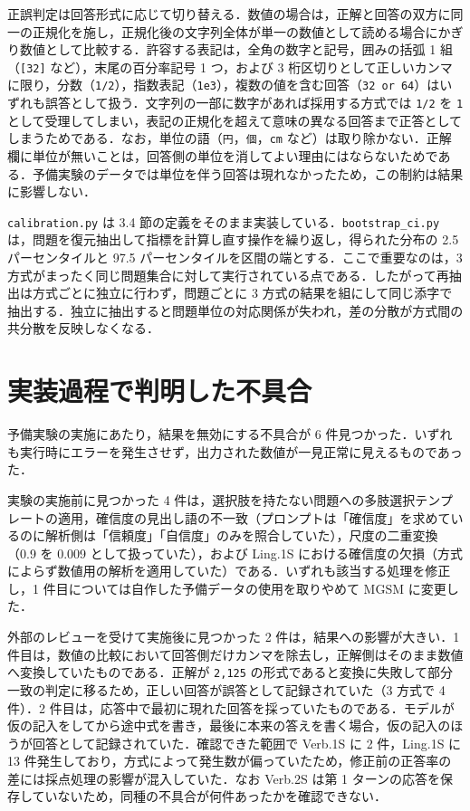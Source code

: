 正誤判定は回答形式に応じて切り替える．数値の場合は，正解と回答の双方に同一の正規化を施し，正規化後の文字列全体が単一の数値として読める場合にかぎり数値として比較する．許容する表記は，全角の数字と記号，囲みの括弧 1 組（\texttt{[32]} など），末尾の百分率記号 1 つ，および 3 桁区切りとして正しいカンマに限り，分数（\texttt{1/\allowbreak{}2}），指数表記（\texttt{1e3}），複数の値を含む回答（\texttt{32 or 64}）はいずれも誤答として扱う．文字列の一部に数字があれば採用する方式では \texttt{1/\allowbreak{}2} を \texttt{1} として受理してしまい，表記の正規化を超えて意味の異なる回答まで正答としてしまうためである．なお，単位の語（\texttt{円}，\texttt{個}，\texttt{cm} など）は取り除かない．正解欄に単位が無いことは，回答側の単位を消してよい理由にはならないためである．予備実験のデータでは単位を伴う回答は現れなかったため，この制約は結果に影響しない．

\texttt{calibration.\allowbreak{}py} は 3.4 節の定義をそのまま実装している．\texttt{bootstrap\_\allowbreak{}ci.\allowbreak{}py} は，問題を復元抽出して指標を計算し直す操作を繰り返し，得られた分布の 2.5 パーセンタイルと 97.5 パーセンタイルを区間の端とする．ここで重要なのは，3 方式がまったく同じ問題集合に対して実行されている点である．したがって再抽出は方式ごとに独立に行わず，問題ごとに 3 方式の結果を組にして同じ添字で抽出する．独立に抽出すると問題単位の対応関係が失われ，差の分散が方式間の共分散を反映しなくなる．

\section{実装過程で判明した不具合}

予備実験の実施にあたり，結果を無効にする不具合が 6 件見つかった．いずれも実行時にエラーを発生させず，出力された数値が一見正常に見えるものであった．

実験の実施前に見つかった 4 件は，選択肢を持たない問題への多肢選択テンプレートの適用，確信度の見出し語の不一致（プロンプトは「確信度」を求めているのに解析側は「信頼度」「自信度」のみを照合していた），尺度の二重変換（0.9 を 0.009 として扱っていた），および Ling.1S における確信度の欠損（方式によらず数値用の解析を適用していた）である．いずれも該当する処理を修正し，1 件目については自作した予備データの使用を取りやめて MGSM に変更した．

外部のレビューを受けて実施後に見つかった 2 件は，結果への影響が大きい．1 件目は，数値の比較において回答側だけカンマを除去し，正解側はそのまま数値へ変換していたものである．正解が \texttt{2,125} の形式であると変換に失敗して部分一致の判定に移るため，正しい回答が誤答として記録されていた（3 方式で 4 件）．2 件目は，応答中で最初に現れた回答を採っていたものである．モデルが仮の記入をしてから途中式を書き，最後に本来の答えを書く場合，仮の記入のほうが回答として記録されていた．確認できた範囲で Verb.1S に 2 件，Ling.1S に 13 件発生しており，方式によって発生数が偏っていたため，修正前の正答率の差には採点処理の影響が混入していた．なお Verb.2S は第 1 ターンの応答を保存していないため，同種の不具合が何件あったかを確認できない．

